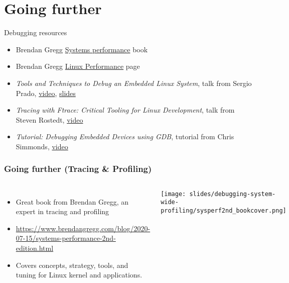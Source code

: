 \section{Going further}

\begin{frame}{Debugging resources}
  \begin{itemize}
  \item Brendan Gregg
    \href{https://www.brendangregg.com/systems-performance-2nd-edition-book.html}{Systems
      performance} book
  \item Brendan Gregg
    \href{https://www.brendangregg.com/linuxperf.html}{Linux
      Performance} page
  \item {\em Tools and Techniques to Debug an Embedded Linux System},
    talk from Sergio Prado,
    \href{https://www.youtube.com/watch?v=dgPkZnGuIMg}{video},
    \href{https://elinux.org/images/c/cf/Slides-debugging.pdf}{slides}
  \item {\em Tracing with Ftrace: Critical Tooling for Linux
      Development}, talk from Steven Rostedt,
    \href{https://www.youtube.com/watch?v=mlxqpNvfvEQ}{video}
  \item {\em Tutorial: Debugging Embedded Devices using GDB}, tutorial
    from Chris Simmonds,
    \href{https://www.youtube.com/watch?v=JGhAgd2a_Ck}{video}
  \end{itemize}
\end{frame}

\begin{frame}[fragile]
  \frametitle{Going further (Tracing \& Profiling)}
  \begin{columns}
    \begin{itemize}
    \item Great book from Brendan Gregg, an expert in tracing and profiling
    \item \url{https://www.brendangregg.com/blog/2020-07-15/systems-performance-2nd-edition.html}
    \item Covers concepts, strategy, tools, and tuning for Linux kernel
      and applications.
    \end{itemize}
    \texttt{[image: slides/debugging-system-wide-profiling/sysperf2nd\_bookcover.png]}\\ 
  \end{columns}
\end{frame}

